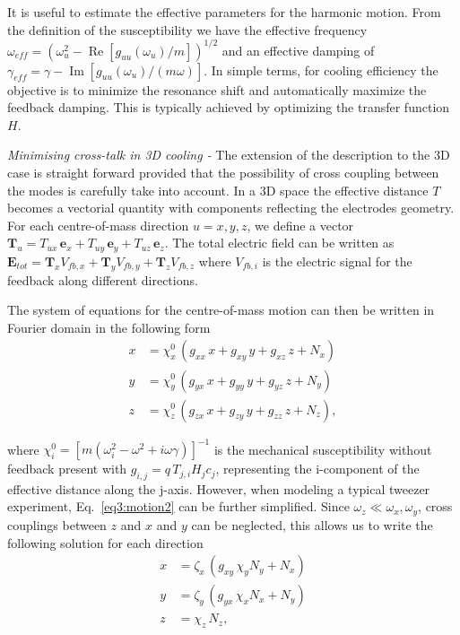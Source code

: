 \documentclass[aps,pra,twocolumn,nopacs,superscriptaddress,groupedaddress]{revtex4}
\renewcommand\Re{\operatorname{Re}}
\renewcommand\Im{\operatorname{Im}}
\begin{document}
It is useful to estimate the effective parameters for the harmonic motion. From the definition of the susceptibility we have the effective frequency $\omega_{eff}=(\omega_u^2-\Re[g_{uu}(\omega_u)/m])^{1/2} $ and an effective damping of $\gamma_{eff}=\gamma-\Im[g_{uu}(\omega_u)/(m\omega)]$. In simple terms, for cooling efficiency the objective is to minimize the resonance shift and automatically maximize the feedback damping. This is typically achieved by optimizing the transfer function $H$. 

\emph{Minimising cross-talk in 3D cooling - }
The extension of the description to the 3D case is straight forward provided that the possibility of cross coupling between the modes is carefully take into account. In a 3D space the effective distance $T$ becomes a vectorial quantity with components reflecting the electrodes geometry. For each centre-of-mass direction $u=x,y,z$, we define a vector $\textbf{T}_u=T_{ux}\, \textbf{e}_x + T_{uy}\, \textbf{e}_y + T_{uz}\, \textbf{e}_z$. The total electric field can be written as  $\textbf{E}_{tot}=\textbf{T}_x V_{fb,x}+\textbf{T}_y V_{fb,y}+\textbf{T}_z V_{fb,z}$ where $V_{fb,i}$ is the electric signal for the feedback along different directions.

The system of equations for the centre-of-mass motion can then be written in Fourier domain in the following form
\begin{equation}\label{eq3:motion2}
\begin{split}
  x&=\chi_x^0\, (g_{xx}\, x+ g_{xy}\, y+g_{xz}\, z+ N_x) \\
  y&=\chi_y^0\, (g_{yx}\, x+ g_{yy}\, y+g_{yz}\, z+ N_y)\\
  z&=\chi_z^0\, (g_{zx}\, x+ g_{zy}\, y+g_{zz}\, z+ N_z),
\end{split}
\end{equation}

\noindent where $\chi_i^0=[m(\omega_i^2-\omega^2+i\omega \gamma)]^{-1}$ is the mechanical susceptibility without feedback present with $g_{i,j}=q\,T_{j,i} H_j c_j$, representing the i-component of the effective distance along the j-axis. However, when modeling a typical tweezer experiment, Eq.~\ref{eq3:motion2} can be further simplified. Since $\omega_z\ll \omega_x,\omega_y$, cross couplings between $z$ and $x$ and $y$ can be neglected, this allows us to write the following solution for each direction
\begin{equation}\label{eq4:sol}
\begin{split}
  x&=\zeta_x\, (g_{xy}\,\chi_y N_y + N_x) \\
  y&=\zeta_y\, (g_{yx}\,\chi_x N_x + N_y)\\
  z&=\chi_z\,  N_z,
\end{split}
\end{equation}
\end{document}
